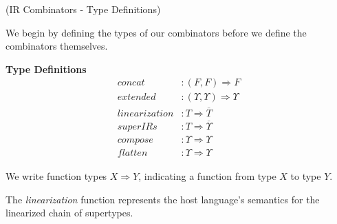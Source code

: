 \documentclass[10pt]{sigplanconf}
\theoremstyle{definition}
\theoremstyle{definition}
\begin{document}
\begin{defn}{(IR Combinators - Type Definitions)}

We begin by defining the types of our combinators before we define the
combinators themselves.

\vspace{0.2cm}
{\bf Type Definitions}
{\small
\begin{align*}
\textit{concat}&        : (F, F) \Rightarrow F\\
\textit{extended}&      : (\Upsilon, \Upsilon) \Rightarrow \Upsilon\\
\textit{linearization}& : T \Rightarrow \overline{T}\\
\textit{superIRs}&      : T \Rightarrow \overline{\Upsilon}\\
\textit{compose}&       : \Upsilon \Rightarrow \Upsilon\\
\textit{flatten}&       : \Upsilon \Rightarrow \Upsilon
\end{align*}
}%

We write function types $X \Rightarrow Y$, indicating a function from type $X$
to type $Y$.

The \textit{linearization} function represents the host language's semantics for the
linearized chain of supertypes.\footnotemark[3]
\end{defn}
\end{document}
